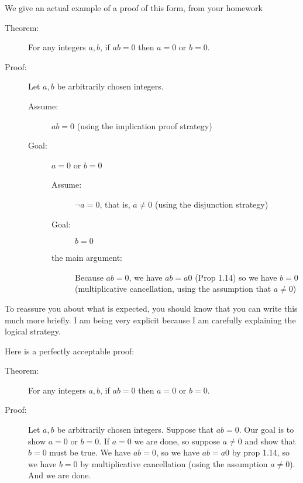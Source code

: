 \documentclass[12pt]{article}
\begin{document}
We give an actual example of a proof of this form, from your homework

\begin{description}

\item[Theorem:]  For any integers $a,b$, if $ab=0$ then $a=0$ or $b=0$.

\item[Proof:]

Let $a,b$ be arbitrarily chosen integers.

\begin{description}

\item[Assume:]  $ab=0$ (using the implication proof strategy)

\item[Goal:]  $a=0$ or $b=0$

\begin{description}

\item[Assume:]  $\neg a=0$, that is, $a \neq 0$ (using the disjunction strategy)

\item[Goal:]  $b=0$

\item[the main argument:]  Because $ab=0$, we have $ab = a0$ (Prop 1.14) so we have $b=0$ (multiplicative cancellation, using the assumption that $a \neq 0$)

\end{description}


\end{description}


\end{description}

To reassure you about what is expected, you should know that you can write this much more briefly.  I am being very explicit because I am carefully explaining the logical strategy.

Here is a perfectly acceptable proof:

\begin{description}

\item[Theorem:]  For any integers $a,b$, if $ab=0$ then $a=0$ or $b=0$.

\item[Proof:]  Let $a,b$ be arbitrarily chosen integers.  Suppose that $ab=0$.  Our goal is to show $a=0$ or $b=0$.
If $a=0$ we are done, so suppose $a \neq 0$ and show that $b=0$ must be true.   We have $ab=0$, so we have $ab=a0$ by prop 1.14, so we have $b=0$ by multiplicative cancellation (using the assumption $a\neq 0$).  And we are done.

\end{description}
\end{document}
